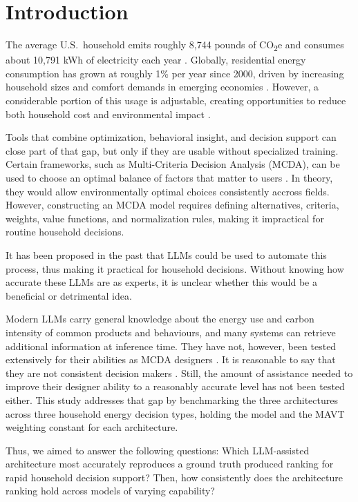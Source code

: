 \documentclass[a4paper,fleqn]{cas-dc}
\begin{document}
\section{Introduction}
\label{sec1}
The average U.S.\ household emits roughly 8{,}744 pounds of CO\textsubscript{2}e and consumes about 10{,}791 kWh of electricity each year \citep{epa_household2024,eia_faq_electricity2024}. Globally, residential energy consumption has grown at roughly 1\% per year since 2000, driven by increasing household sizes and comfort demands in emerging economies \citep{GONZALEZTORRES2022112428}. However, a considerable portion of this usage is adjustable, creating opportunities to reduce both household cost and environmental impact \citep{dietz2009,ohler2020}.

Tools that combine optimization, behavioral insight, and decision support can close part of that gap, but only if they are usable without specialized training. Certain frameworks, such as Multi-Criteria Decision Analysis (MCDA), can be used to choose an optimal balance of factors that matter to users \citep{huang2011}. In theory, they would allow environmentally optimal choices consistently accross fields. However, constructing an MCDA model requires defining alternatives, criteria, weights, value functions, and normalization rules, making it impractical for routine household decisions.

It has been proposed in the past that LLMs could be used to automate this process, thus making it practical for household decisions. Without knowing how accurate these LLMs are as experts, it is unclear whether this would be a beneficial or detrimental idea.

Modern LLMs carry general knowledge about the energy use and carbon intensity of common products and behaviours, and many systems can retrieve additional information at inference time. They have not, however, been tested extensively for their abilities as MCDA designers \citep{svoboda2024,icaart26}. It is reasonable to say that they are not consistent decision makers \citep{wang2024fairescalers,li2026scoringbias}. Still, the amount of assistance needed to improve their designer ability to a reasonably accurate level has not been tested either. This study addresses that gap by benchmarking the three architectures across three household energy decision types, holding the model and the MAVT weighting constant for each architecture.

Thus, we aimed to answer the following questions: Which LLM-assisted architecture most accurately reproduces a ground truth produced ranking for rapid household decision support?
Then, how consistently does the architecture ranking hold across models of varying capability?
\end{document}

